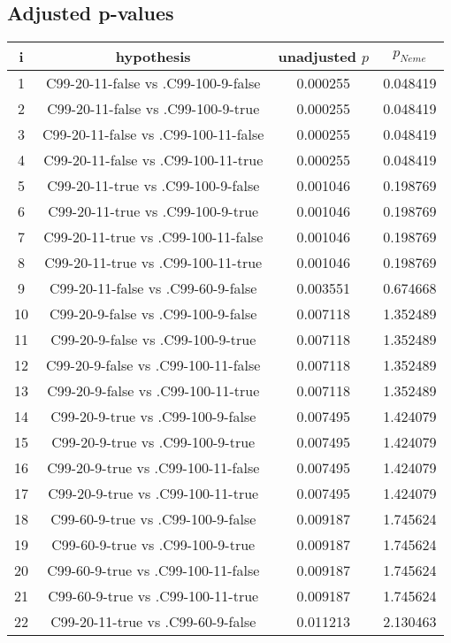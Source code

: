 \documentclass[a4paper,10pt]{article}
\begin{document}
\begin{landscape}
\pagebreak

\subsection{Adjusted p-values}

\begin{table}[!htp]
\centering\scriptsize
\begin{tabular}{cccc}
i&hypothesis&unadjusted $p$&$p_{Neme}$\\
\hline1&C99-20-11-false vs .C99-100-9-false&0.000255&0.048419\\
2&C99-20-11-false vs .C99-100-9-true&0.000255&0.048419\\
3&C99-20-11-false vs .C99-100-11-false&0.000255&0.048419\\
4&C99-20-11-false vs .C99-100-11-true&0.000255&0.048419\\
5&C99-20-11-true vs .C99-100-9-false&0.001046&0.198769\\
6&C99-20-11-true vs .C99-100-9-true&0.001046&0.198769\\
7&C99-20-11-true vs .C99-100-11-false&0.001046&0.198769\\
8&C99-20-11-true vs .C99-100-11-true&0.001046&0.198769\\
9&C99-20-11-false vs .C99-60-9-false&0.003551&0.674668\\
10&C99-20-9-false vs .C99-100-9-false&0.007118&1.352489\\
11&C99-20-9-false vs .C99-100-9-true&0.007118&1.352489\\
12&C99-20-9-false vs .C99-100-11-false&0.007118&1.352489\\
13&C99-20-9-false vs .C99-100-11-true&0.007118&1.352489\\
14&C99-20-9-true vs .C99-100-9-false&0.007495&1.424079\\
15&C99-20-9-true vs .C99-100-9-true&0.007495&1.424079\\
16&C99-20-9-true vs .C99-100-11-false&0.007495&1.424079\\
17&C99-20-9-true vs .C99-100-11-true&0.007495&1.424079\\
18&C99-60-9-true vs .C99-100-9-false&0.009187&1.745624\\
19&C99-60-9-true vs .C99-100-9-true&0.009187&1.745624\\
20&C99-60-9-true vs .C99-100-11-false&0.009187&1.745624\\
21&C99-60-9-true vs .C99-100-11-true&0.009187&1.745624\\
22&C99-20-11-true vs .C99-60-9-false&0.011213&2.130463\\

\end{tabular}
\end{table}
\end{landscape}
\end{document}
